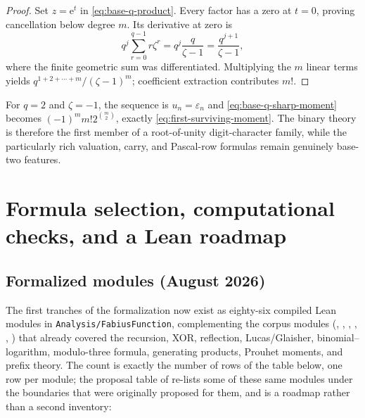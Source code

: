 \documentclass[11pt,oneside]{article}
\numberwithin{equation}{section}
\theoremstyle{definition}
\theoremstyle{remark}
\newcommand{\e}{\mathrm e}
\newcommand{\eps}{\varepsilon}
\newcommand{\repo}{\nolinkurl{Analysis/FabiusFunction}}
\begin{document}
\begin{proof}
Set \(z=\e^t\) in \eqref{eq:base-q-product}.  Every factor has a zero at
\(t=0\), proving cancellation below degree \(m\).  Its derivative at zero is
\begin{equation}
 q^j\sum_{r=0}^{q-1}r\zeta^r
 =q^j\frac{q}{\zeta-1}
 =\frac{q^{j+1}}{\zeta-1},
 \label{eq:root-unity-derivative}
\end{equation}
where the finite geometric sum was differentiated.  Multiplying the \(m\)
linear terms yields
\(q^{1+2+\cdots+m}/(\zeta-1)^m\); coefficient extraction contributes \(m!\).
\end{proof}

For \(q=2\) and \(\zeta=-1\), the sequence is \(u_n=\eps_n\) and
\eqref{eq:base-q-sharp-moment} becomes
\((-1)^mm!2^{\binom m2}\), exactly
\eqref{eq:first-surviving-moment}.  The binary theory is therefore the first
member of a root-of-unity digit-character family, while the particularly rich
valuation, carry, and Pascal-row formulas remain genuinely base-two features.

\section[Formula selection and Lean roadmap]{Formula selection, computational checks, and a Lean roadmap}
\label{sec:formalization}

\subsection{Formalized modules (August 2026)}
\label{sec:formalized-modules}

The first tranches of the formalization now exist as eighty-six
compiled Lean modules in \repo{}, complementing the corpus modules
(, , ,
, ,
) that already covered the recursion,
XOR, reflection, Lucas/Glaisher, binomial--logarithm, modulo-three
formula, generating products, Prouhet moments, and prefix theory.  The
count is exactly the number of rows of the table below, one row per
module; the proposal table of  re-lists
some of these same modules under the boundaries that were originally
proposed for them, and is a roadmap rather than a second inventory:
\end{document}
